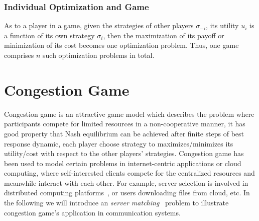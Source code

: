 

\subsubsection{Individual Optimization and Game}
As to a player in a game, given the strategies of other players $\sigma_{-i}$, its utility $u_i$ is a function of its own strategy $\sigma_i$, then the maximization of its payoff or minimization of its cost becomes one optimization problem.
Thus, one game comprises $n$ such optimization problems in total.





\section{Congestion Game}
\label{congsetion_game}




Congestion game is an attractive game model which describes the problem where participants compete for limited resources in a non-cooperative manner, it has good property that Nash equilibrium can be achieved after finite steps of best response dynamic, \ie each player choose strategy to maximizes/minimizes its utility/cost with respect to the other players' strategies.
Congestion game has been used to model certain problems in internet-centric applications or cloud computing, where self-interested clients compete for the centralized resources and meanwhile interact with each other.
For example, server selection is involved in distributed computing platforms~\cite{Cloud_Computing_2010}, or users downloading files from cloud, etc.
In the following we will introduce an \textit{server matching}~\cite{kothari:congestion_serverMatching} problem to illustrate congestion game's application in communication systems.

